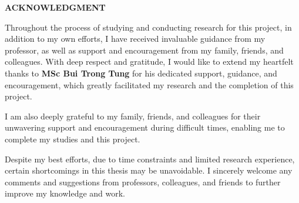 \documentclass[../main.tex]{subfiles}
\begin{document}
\begin{center}
    \Large{\textbf{ACKNOWLEDGMENT}}\\
\end{center}
\vspace{1cm}
Throughout the process of studying and conducting research for this project, in addition to my own efforts, I have received invaluable guidance from my professor, as well as support and encouragement from my family, friends, and colleagues. With deep respect and gratitude, I would like to extend my heartfelt thanks to \textbf{MSc Bui Trong Tung} for his dedicated support, guidance, and encouragement, which greatly facilitated my research and the completion of this project.

I am also deeply grateful to my family, friends, and colleagues for their unwavering support and encouragement during difficult times, enabling me to complete my studies and this project.

Despite my best efforts, due to time constraints and limited research experience, certain shortcomings in this thesis may be unavoidable. I sincerely welcome any comments and suggestions from professors, colleagues, and friends to further improve my knowledge and work.
\end{document}
